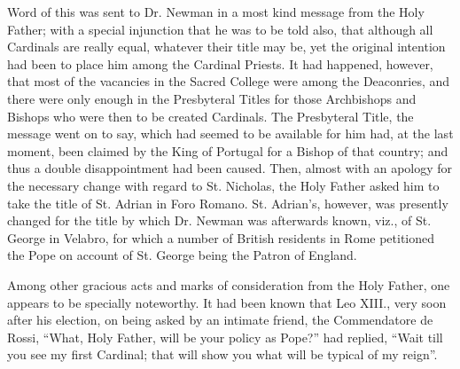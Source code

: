 Word of this was sent to Dr. Newman in a most kind message from the
Holy Father; with a special injunction that he was to be told also,
that although all Cardinals are really equal, whatever their title may
be, yet the original intention had been to place him among the
Cardinal Priests. It had happened, however, that most of the vacancies
in the Sacred College were among the Deaconries, and there were only
enough in the Presbyteral Titles for those Archbishops and Bishops who
were then to be created Cardinals. The Presbyteral Title, the message
went on to say, which had seemed to be available for him had, at the
last moment, been claimed by the King of Portugal for a Bishop of that
country; and thus a double disappointment had been caused. Then,
almost with an apology for the necessary change with regard to St.
Nicholas, the Holy Father asked him to take the title of St. Adrian in
Foro Romano. St. Adrian's, however, was presently changed for the
title by which Dr. Newman was afterwards known, viz., of St. George in
Velabro, for which a number of British residents in Rome petitioned
the Pope on account of St. George being the Patron of England.

Among other gracious acts and marks of consideration from the Holy
Father, one appears to be specially noteworthy. It had been known that
Leo XIII., very soon after his election, on being asked by an
intimate friend, the Commendatore de Rossi, ``What, Holy Father,
will be your policy as Pope?'' had replied, ``Wait till you
see my first Cardinal; that will show you what will be typical of my
reign''.

